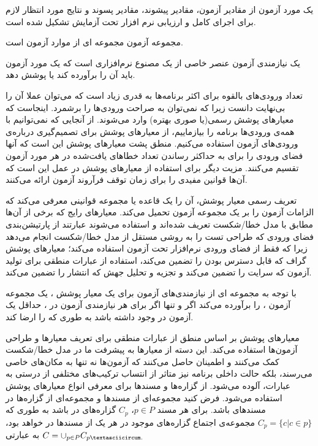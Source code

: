 یک مورد آزمون از مقادیر آزمون، مقادیر پیشوند، مقادیر پسوند و نتایج مورد انتظار لازم برای اجرای کامل و ارزیابی نرم افزار تحت آزمایش تشکیل شده است.


مجموعه آزمون مجموعه ای از موارد آزمون است.


یک نیازمندی آزمون عنصر خاصی از یک مصنوع نرم‌افزاری است که یک مورد آزمون باید آن را برآورده کند یا پوشش دهد.




تعداد ورودی‌های بالقوه برای اکثر برنامه‌ها به قدری زیاد است که می‌توان عملا آن را بی‌نهایت دانست زیرا که نمی‌توان به صراحت ورودی‌ها را برشمرد. اینجاست که معیارهای پوشش رسمی(یا صوری بهتره) وارد می‌شوند. از آنجایی که نمی‌توانیم با همه‌ی ورودی‌ها برنامه را بیازماییم، از معیارهای پوشش برای تصمیم‌گیری درباره‌ی ورودی‌های آزمون استفاده می‌کنیم. منطق پشت معیارهای پوشش این است که آنها فضای ورودی را برای به حداکثر رساندن تعداد خطاهای یافت‌شده در هر مورد آزمون تقسیم می‌کنند. مزیت دیگر برای استفاده از معیارهای پوشش در عمل این است که آن‌ها قوانین مفیدی را برای زمان توقف فرآروند آزمون ارائه می‌کنند. 

تعریف رسمی معیار پوشش، آن را یک قاعده یا مجموعه قوانینی معرفی می‌کند که الزامات آزمون را بر یک مجموعه آزمون تحمیل می‌کند.
معیار‌های رایج‌ که برخی از آن‌ها مطابق با مدل خطا/شکست تعریف ‌شده‌اند و استفاده می‌شوند عبارتند از پارتیشن‌بندی فضای ورودی که طراحی تست را به روشی مستقل از مدل خطا/شکست انجام می‌دهد زیرا که فقط از فضای ورودی نرم‌افزار تحت آزمون استفاده می‌کند؛ معیارهای پوشش گراف که قابل دسترس بودن را تضمین می‌کند، استفاده از عبارات منطقی برای تولید آزمون که سرایت را تضمین می‌کند و تجزیه و تحلیل جهش که انتشار را تضمین می‌کند.


با توجه به مجموعه ای از نیازمندی‌های آزمون  برای یک معیار پوشش ، یک مجموعه آزمون ،  را برآورده می‌کند اگر و تنها اگر برای هر نیازمندی آزمون  در ، حداقل یک آزمون  در  وجود داشته باشد به طوری که  را ارضا کند.


معیارهای پوشش بر اساس منطق از عبارات منطقی برای تعریف معیارها و طراحی آزمون‌ها استفاده می‌کند. این دسته از معیارها به پیشرفت ما در مدل خطا/شکست کمک می‌کنند و اطمینان حاصل می‌کنند که آزمون‌ها نه تنها به مکان‌های خاصی می‌رسند، بلکه حالت داخلی برنامه نیز متاثر از انتساب ترکیب‌های مختلفی از درستی به عبارات، آلوده می‌شود.
از گزاره‌ها و مسندها برای معرفی انواع معیارهای پوشش استفاده می‌‌شود. فرض کنید  مجموعه‌ای از مسندها و  مجموعه‌ای از گزاره‌ها در مسندهای  باشد. برای هر مسند 
$p \in P$، 
$C_p$ گزاره‌های در  باشد به طوری که 
$C_p = \{c| c \in p\}$
مجموعه‌ی  اجتماع گزاره‌های موجود در هر یک از مسندها در  خواهد بود، به عبارتی 
$C = \cup_{p\in P} C_{p\textasciicircum.}$

